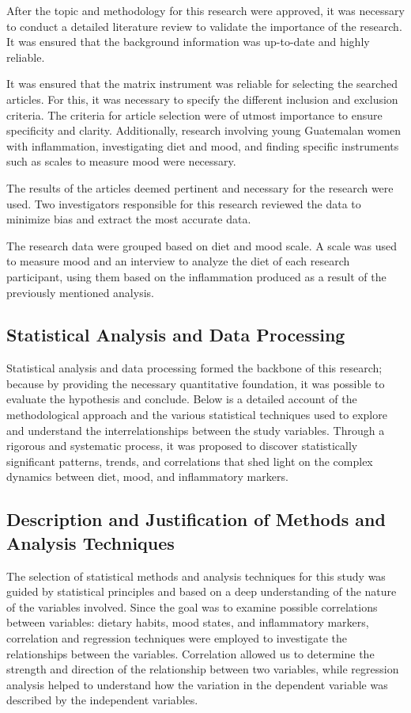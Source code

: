 \documentclass[jou]{apa7}
\begin{document}
After the topic and methodology for this research were approved, it was necessary to conduct a detailed literature review to validate the importance of the research. It was ensured that the background information was up-to-date and highly reliable.

It was ensured that the matrix instrument was reliable for selecting the searched articles. For this, it was necessary to specify the different inclusion and exclusion criteria. The criteria for article selection were of utmost importance to ensure specificity and clarity. Additionally, research involving young Guatemalan women with inflammation, investigating diet and mood, and finding specific instruments such as scales to measure mood were necessary.

The results of the articles deemed pertinent and necessary for the research were used. Two investigators responsible for this research reviewed the data to minimize bias and extract the most accurate data.

The research data were grouped based on diet and mood scale. A scale was used to measure mood and an interview to analyze the diet of each research participant, using them based on the inflammation produced as a result of the previously mentioned analysis.

\subsection{Statistical Analysis and Data Processing}

Statistical analysis and data processing formed the backbone of this research; because by providing the necessary quantitative foundation, it was possible to evaluate the hypothesis and conclude. Below is a detailed account of the methodological approach and the various statistical techniques used to explore and understand the interrelationships between the study variables. Through a rigorous and systematic process, it was proposed to discover statistically significant patterns, trends, and correlations that shed light on the complex dynamics between diet, mood, and inflammatory markers.


\subsection{Description and Justification of Methods and Analysis Techniques}\label{descripciuxf3n-y-justificaciuxf3n-de-muxe9todos-y-tuxe9cnicas-de-anuxe1lisis}

The selection of statistical methods and analysis techniques for this study was guided by statistical principles and based on a deep understanding of the nature of the variables involved. Since the goal was to examine possible correlations between variables: dietary habits, mood states, and inflammatory markers, correlation and regression techniques were employed to investigate the relationships between the variables. Correlation allowed us to determine the strength and direction of the relationship between two variables, while regression analysis helped to understand how the variation in the dependent variable was described by the independent variables.\\
\end{document}
